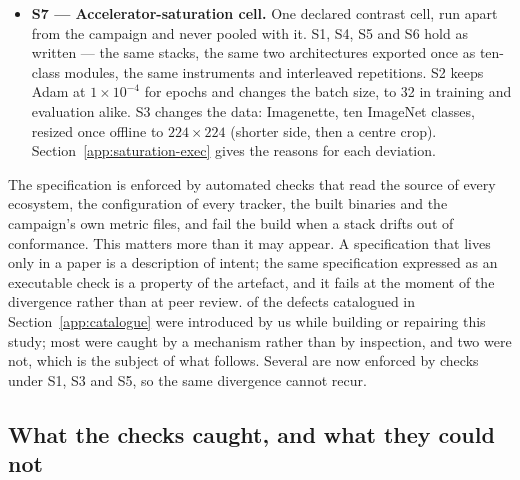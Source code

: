\begin{itemize}
        run contract into each stack's data order and its initialisation, and
        two of the three ways a stack can ignore the seed it is handed are now
        checked against the stacks' source rather than against the campaign
        planner alone.
  \item \textbf{S7 --- Accelerator-saturation cell.} One declared contrast
        cell, run apart from the campaign and never pooled with it. S1, S4, S5
        and S6 hold as written --- the same \vSatEcosystems{} stacks, the same
        two architectures exported once as ten-class modules, the same
        instruments and \vSatReps{} interleaved repetitions. S2 keeps Adam at
        $1\times10^{-4}$ for \vSatEpochs{} epochs and changes the batch size,
        to 32 in training and evaluation alike. S3 changes the data: Imagenette,
        ten ImageNet classes, resized once offline to $224\times224$ (shorter
        side, then a centre crop). Section~\ref{app:saturation-exec} gives the reasons for each
        deviation.
\end{itemize}



The specification is enforced by \vConformanceChecks{} automated checks that
read the source of every ecosystem, the configuration of every tracker, the
built binaries and the campaign's own metric files, and fail the build when a
stack drifts out of conformance. This matters more than it may appear.
A specification that lives only in a paper is a description of intent; the same
specification expressed as an executable check is a property of the artefact,
and it fails at the moment of the divergence rather than at peer review.
\vDefectOurs{} of the defects catalogued in Section~\ref{app:catalogue} were
introduced by us while building or repairing this study; most were caught by a
mechanism rather than by inspection, and two were not, which is the subject of
what follows. Several are now enforced by checks under S1, S3 and S5, so the
same divergence cannot recur.

\subsection{What the checks caught, and what they could not}
\label{app:checks}

